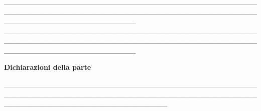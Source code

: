 \documentclass[12pt]{article}
\begin{document}
\begin{itemize}
\_\_\_\_\_\_\_\_\_\_\_\_\_\_\_\_\_\_\_\_\_\_\_\_\_\_\_\_\_\_\_\_\_\_\_\_\_\_\_\_\_\_\_\_\_\_\_\_\_\_\_\_\_\_\_\_\_\_\_\_\_\_\_\_\_\_\_\_\_\_\_\_\_\_\_\_\_\_\_\_\_\_\_\_\_\_\_\_\_\_\_\_\_\_\_\_\_\_\_\_\_\_\_\_\_\_\_\_\_\_\_\_\_\_\_\_\_\_\_\_\_ \\
\_\_\_\_\_\_\_\_\_\_\_\_\_\_\_\_\_\_\_\_\_\_\_\_\_\_\_\_\_\_\_\_\_\_\_\_\_\_\_\_\_\_\_\_\_\_\_\_\_\_\_\_\_\_\_\_\_\_\_\_\_\_\_\_\_\_\_\_\_\_\_\_\_\_\_\_\_\_\_\_\_\_\_\_\_\_\_\_\_\_\_\_\_\_\_\_\_\_\_\_\_\_\_\_\_\_\_\_\_\_\_\_\_\_\_\_\_\_\_\_\_ \\
\end{itemize}

\begin{center}
    \textbf{Dichiarazioni della parte}
\end{center}

\_\_\_\_\_\_\_\_\_\_\_\_\_\_\_\_\_\_\_\_\_\_\_\_\_\_\_\_\_\_\_\_\_\_\_\_\_\_\_\_\_\_\_\_\_\_\_\_\_\_\_\_\_\_\_\_\_\_\_\_\_\_\_\_\_\_\_\_\_\_\_\_\_\_\_\_\_\_\_\_\_\_\_\_\_\_\_\_\_\_\_\_\_\_\_\_\_\_\_\_\_\_\_\_\_\_\_\_\_\_\_\_\_\_\_\_\_\_\_\_\_\_\_\_\_\_\_ \\
\end{document}
